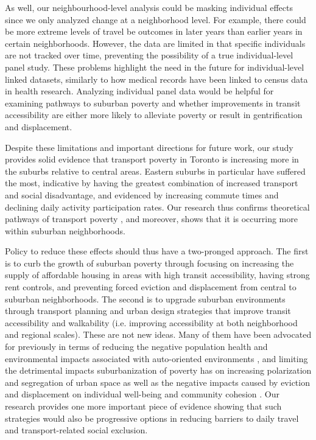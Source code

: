 As well, our neighbourhood-level analysis could be masking individual effects since we only analyzed change at a neighborhood level. For example, there could be more extreme levels of travel be outcomes in later years than earlier years in certain neighborhoods. However, the data are limited in that specific individuals are not tracked over time, preventing the possibility of a true individual-level panel study. These problems highlight the need in the future for individual-level linked datasets, similarly to how medical records have been linked to census data in health research. Analyzing individual panel data would be helpful for examining pathways to suburban poverty and whether improvements in transit accessibility are either more likely to alleviate poverty or result in gentrification and displacement.

Despite these limitations and important directions for future work, our study provides solid evidence that transport poverty in Toronto is increasing more in the suburbs relative to central areas. Eastern suburbs in particular have suffered the most, indicative by having the greatest combination of increased transport and social disadvantage, and evidenced by increasing commute times and declining daily activity participation rates. Our research thus confirms theoretical pathways of transport poverty \cite{lucas_transport_2012}, and moreover, shows that it is occurring more within suburban neighborhoods.

Policy to reduce these effects should thus have a two-pronged approach. The first is to curb the growth of suburban poverty through focusing on increasing the supply of affordable housing in areas with high transit accessibility, having strong rent controls, and preventing forced eviction and displacement from central to suburban neighborhoods. The second is to upgrade suburban environments through transport planning and urban design strategies that improve transit accessibility and walkability (i.e. improving accessibility at both neighborhood and regional scales). These are not new ideas. Many of them have been advocated for previously in terms of reducing the negative population health and environmental impacts associated with auto-oriented environments , and limiting the detrimental impacts suburbanization of poverty has on increasing polarization and segregation of urban space as well as the negative impacts caused by eviction and displacement on individual well-being and community cohesion  . Our research provides one more important piece of evidence showing that such strategies would also be progressive options in reducing barriers to daily travel and transport-related social exclusion.








